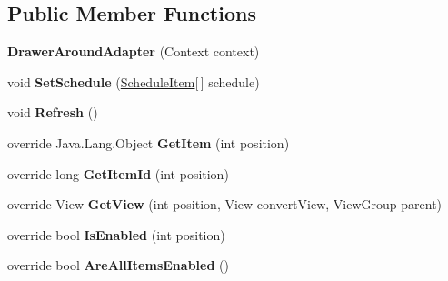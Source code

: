 \subsection*{Public Member Functions}
\begin{DoxyCompactItemize}
\item 
{\bfseries Drawer\+Around\+Adapter} (Context context)\hypertarget{class_w_c_c_mobile_1_1_drawer_around_adapter_aab98fef8ac6bf8ba811cee127284b60a}{}\label{class_w_c_c_mobile_1_1_drawer_around_adapter_aab98fef8ac6bf8ba811cee127284b60a}

\item 
void {\bfseries Set\+Schedule} (\hyperlink{class_w_c_c_mobile_1_1_models_1_1_schedule_item}{Schedule\+Item}\mbox{[}$\,$\mbox{]} schedule)\hypertarget{class_w_c_c_mobile_1_1_drawer_around_adapter_aa54a7dbf8ed5a7765a5e423d6389d23b}{}\label{class_w_c_c_mobile_1_1_drawer_around_adapter_aa54a7dbf8ed5a7765a5e423d6389d23b}

\item 
void {\bfseries Refresh} ()\hypertarget{class_w_c_c_mobile_1_1_drawer_around_adapter_a79a2da6a7abad5f86e077d3b51a6555d}{}\label{class_w_c_c_mobile_1_1_drawer_around_adapter_a79a2da6a7abad5f86e077d3b51a6555d}

\item 
override Java.\+Lang.\+Object {\bfseries Get\+Item} (int position)\hypertarget{class_w_c_c_mobile_1_1_drawer_around_adapter_a38aa96cdccda8d2573eca6bd00eb1a77}{}\label{class_w_c_c_mobile_1_1_drawer_around_adapter_a38aa96cdccda8d2573eca6bd00eb1a77}

\item 
override long {\bfseries Get\+Item\+Id} (int position)\hypertarget{class_w_c_c_mobile_1_1_drawer_around_adapter_a7218feb737992d13d7ea203487a4136f}{}\label{class_w_c_c_mobile_1_1_drawer_around_adapter_a7218feb737992d13d7ea203487a4136f}

\item 
override View {\bfseries Get\+View} (int position, View convert\+View, View\+Group parent)\hypertarget{class_w_c_c_mobile_1_1_drawer_around_adapter_a0e69bb0ee5bc2234514cf4668c67b79a}{}\label{class_w_c_c_mobile_1_1_drawer_around_adapter_a0e69bb0ee5bc2234514cf4668c67b79a}

\item 
override bool {\bfseries Is\+Enabled} (int position)\hypertarget{class_w_c_c_mobile_1_1_drawer_around_adapter_a78b1ed19fd3e9b7e48d9e56a06071867}{}\label{class_w_c_c_mobile_1_1_drawer_around_adapter_a78b1ed19fd3e9b7e48d9e56a06071867}

\item 
override bool {\bfseries Are\+All\+Items\+Enabled} ()\hypertarget{class_w_c_c_mobile_1_1_drawer_around_adapter_a6603b435c5a8c334bd0280bc29ce2893}{}\label{class_w_c_c_mobile_1_1_drawer_around_adapter_a6603b435c5a8c334bd0280bc29ce2893}

\end{DoxyCompactItemize}
